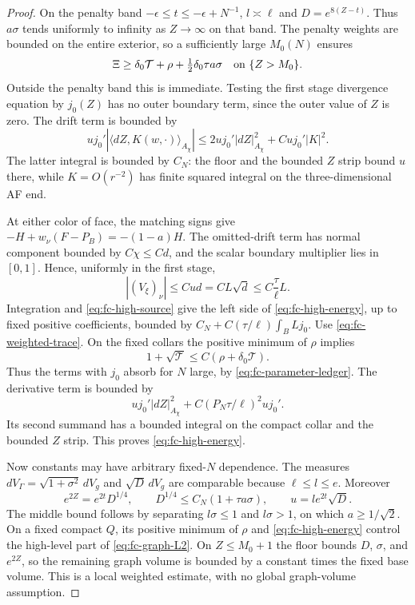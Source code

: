 \begin{proof}
On the penalty band $-\epsilon\le t\le-\epsilon+N^{-1}$,
$l\asymp\ell$ and $D=e^{8(Z-t)}$.  Thus $a\sigma$ tends uniformly
to infinity as $Z\to\infty$ on that band.  The penalty weights
are bounded on the entire exterior, so a sufficiently large
$M_0(N)$ ensures
\begin{equation}\label{eq:fc-high-source}
 \Xi\ge\delta_0\mathcal T+\rho
                    +\tfrac12\delta_0\tau a\sigma
                 \quad\hbox{on }\{Z>M_0\}.
\end{equation}
Outside the penalty band this is immediate.  Testing the first
stage divergence equation by $j_0(Z)$ has no outer boundary term,
since the outer value of $Z$ is zero.  The drift term is bounded by
\[
 u j_0'|\langle dZ,K(w,\cdot)\rangle_{A_\chi}|
 \le 2u j_0'|dZ|_{A_\chi}^2+C u j_0'|K|^2.
\]
The latter integral is bounded by $C_N$: the floor and the bounded
$Z$ strip bound $u$ there, while $K=O(r^{-2})$ has finite squared
integral on the three-dimensional AF end.

At either color of face, the matching signs give
$-H+w_\nu(F-P_B)=-(1-a)H$.
The omitted-drift term has normal component bounded by
$C\chi\le Cd$, and the scalar boundary multiplier lies in
$[0,1]$.  Hence, uniformly in the first stage,
\begin{equation}\label{eq:fc-boundary-flux-small}
 |(V_\xi)_\nu|\le Cud=CL\sqrt d
                  \le C\frac\tau\ell L.
\end{equation}
Integration and \eqref{eq:fc-high-source} give the left side of
\eqref{eq:fc-high-energy}, up to fixed positive coefficients,
bounded by $C_N+C(\tau/\ell)\int_B L j_0$.
Use \eqref{eq:fc-weighted-trace}.  On the fixed collars the
positive minimum of $\rho$ implies
\[
 1+\sqrt{\mathcal T}\le C(\rho+\delta_0\mathcal T).
\]
Thus the terms with $j_0$ absorb for $N$ large, by
\eqref{eq:fc-parameter-ledger}.  The derivative term is bounded by
\[
 u j_0'|dZ|_{A_\chi}^2
                  +C(P_N\tau/\ell)^2u j_0'.
\]
Its second summand has a bounded integral on the compact collar
and the bounded $Z$ strip.  This proves
\eqref{eq:fc-high-energy}.

Now constants may have arbitrary fixed-$N$ dependence.  The
measures $dV_\Gamma=\sqrt{1+\sigma^2}\,dV_g$ and
$\sqrt D\,dV_g$ are comparable because $\ell\le l\le e$.
Moreover
\[
 e^{2Z}=e^{2t}D^{1/4},\qquad
 D^{1/4}\le C_N(1+\tau a\sigma),\qquad u=le^{2t}\sqrt D.
\]
The middle bound follows by separating $l\sigma\le1$ and
$l\sigma>1$, on which $a\ge1/\sqrt2$.
On a fixed compact $Q$, its positive minimum of $\rho$ and
\eqref{eq:fc-high-energy} control the high-level part of
\eqref{eq:fc-graph-L2}.  On $Z\le M_0+1$ the floor bounds $D$,
$\sigma$, and $e^{2Z}$, so the remaining graph volume is bounded
by a constant times the fixed base volume.  This is a local
weighted estimate, with no global graph-volume assumption.
\end{proof}


